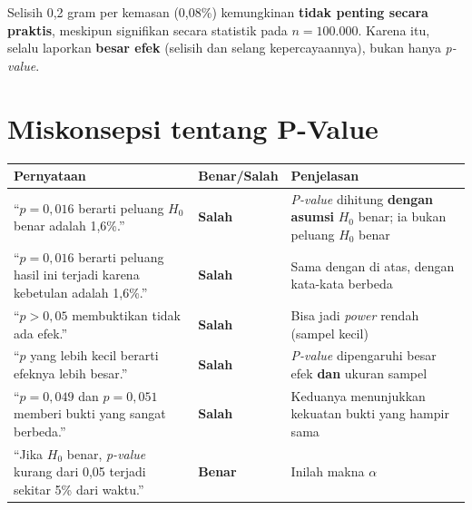 \documentclass[
  indonesian,
  letterpaper,
]{book}
\newcounter{none} %
\begin{document}
Selisih 0,2 gram per kemasan (0,08\%) kemungkinan \textbf{tidak penting
secara praktis}, meskipun signifikan secara statistik pada
\(n = 100.000\). Karena itu, selalu laporkan \textbf{besar efek}
(selisih dan selang kepercayaannya), bukan hanya \emph{p-value}.

\section{Miskonsepsi tentang P-Value}\label{miskonsepsi-tentang-p-value}

{\def\LTcaptype{none} %
\begin{longtable}[]{@{}
  >{\raggedright\arraybackslash}p{}
  >{\centering\arraybackslash}p{}
  >{\raggedright\arraybackslash}p{}@{}}
\toprule\noalign{}
\begin{minipage}[b]{\linewidth}\raggedright
Pernyataan
\end{minipage} & \begin{minipage}[b]{\linewidth}\centering
Benar/Salah
\end{minipage} & \begin{minipage}[b]{\linewidth}\raggedright
Penjelasan
\end{minipage} \\
\midrule\noalign{}
\endhead
\bottomrule\noalign{}
\endlastfoot
``\(p = 0{,}016\) berarti peluang \(H_0\) benar adalah 1,6\%.'' &
\textbf{Salah} & \emph{P-value} dihitung \textbf{dengan asumsi} \(H_0\)
benar; ia bukan peluang \(H_0\) benar \\
``\(p = 0{,}016\) berarti peluang hasil ini terjadi karena kebetulan
adalah 1,6\%.'' & \textbf{Salah} & Sama dengan di atas, dengan kata-kata
berbeda \\
``\(p > 0{,}05\) membuktikan tidak ada efek.'' & \textbf{Salah} & Bisa
jadi \emph{power} rendah (sampel kecil) \\
``\(p\) yang lebih kecil berarti efeknya lebih besar.'' & \textbf{Salah}
& \emph{P-value} dipengaruhi besar efek \textbf{dan} ukuran sampel \\
``\(p = 0{,}049\) dan \(p = 0{,}051\) memberi bukti yang sangat
berbeda.'' & \textbf{Salah} & Keduanya menunjukkan kekuatan bukti yang
hampir sama \\
``Jika \(H_0\) benar, \emph{p-value} kurang dari 0,05 terjadi sekitar
5\% dari waktu.'' & \textbf{Benar} & Inilah makna \(\alpha\) \\
\end{longtable}
}
\end{document}
